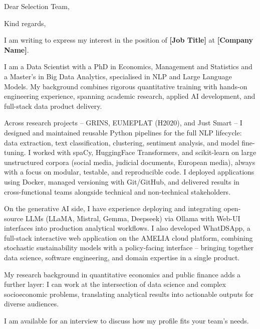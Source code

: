\documentclass[11pt,a4paper,sans]{moderncv}
\begin{document}
\date{\today}
\opening{Dear Selection Team,}
\closing{Kind regards,}
\makelettertitle

I am writing to express my interest in the position of \textbf{[Job Title]} at \textbf{[Company Name]}.

I am a Data Scientist with a PhD in Economics, Management and Statistics and a Master's in Big Data Analytics, specialised in NLP and Large Language Models. My background combines rigorous quantitative training with hands-on engineering experience, spanning academic research, applied AI development, and full-stack data product delivery.

Across research projects -- GRINS, EUMEPLAT (H2020), and Just Smart -- I designed and maintained reusable Python pipelines for the full NLP lifecycle: data extraction, text classification, clustering, sentiment analysis, and model fine-tuning. I worked with spaCy, HuggingFace Transformers, and scikit-learn on large unstructured corpora (social media, judicial documents, European media), always with a focus on modular, testable, and reproducible code. I deployed applications using Docker, managed versioning with Git/GitHub, and delivered results in cross-functional teams alongside technical and non-technical stakeholders.

On the generative AI side, I have experience deploying and integrating open-source LLMs (LLaMA, Mistral, Gemma, Deepseek) via Ollama with Web-UI interfaces into production analytical workflows. I also developed WhatDSApp, a full-stack interactive web application on the AMELIA cloud platform, combining stochastic sustainability models with a policy-facing interface -- bringing together data science, software engineering, and domain expertise in a single product.

My research background in quantitative economics and public finance adds a further layer: I can work at the intersection of data science and complex socioeconomic problems, translating analytical results into actionable outputs for diverse audiences.

I am available for an interview to discuss how my profile fits your team's needs.

\makeletterclosing
\end{document}
